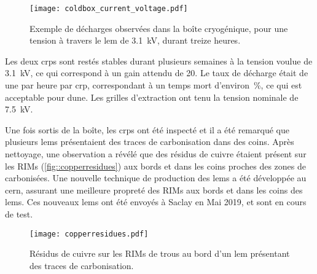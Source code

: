       \begin{figure}[!htb]
        \centering
        \texttt{[image: coldbox\_current\_voltage.pdf]}
        \caption[Décharges observées dans la boîte cryogénique]{\label{fig::coldbox_current_voltage}Exemple de décharges observées dans la boîte cryogénique, pour une tension à travers le \gls{lem} de \SI{3.1}{\kilo\volt}, durant treize heures.}
      \end{figure}
    
      Les deux \glspl{crp} sont restés stables durant plusieurs semaines à la tension voulue de \SI{3.1}{\kilo\volt}, ce qui correspond à un gain attendu de 20. Le taux de décharge était de une par heure par \gls{crp}, correspondant à un temps mort d'environ \,\%, ce qui est acceptable pour \gls{dune}. Les grilles d'extraction ont tenu la tension nominale de \SI{7.5}{\kilo\volt}. 

      Une fois sortis de la boîte, les \glspl{crp} ont été inspecté et il a été remarqué que plusieurs \glspl{lem} présentaient des traces de carbonisation dans des coins. Après nettoyage, une observation a révélé que des résidus de cuivre étaient présent sur les RIMs (\autoref{fig::copperresidues}) aux bords et dans les coins proches des zones de carbonisées. Une nouvelle technique de production des \glspl{lem} a été développée au \gls{cern}, assurant une meilleure propreté des RIMs aux bords et dans les coins des \glspl{lem}. Ces nouveaux \glspl{lem} ont été envoyés à Saclay en Mai 2019, et sont en cours de test.

      \begin{figure}
        \centering
        \texttt{[image: copperresidues.pdf]}
        \caption[Résidus de cuivre sur certains RIMs]{\label{fig::copperresidues}Résidus de cuivre sur les RIMs de trous au bord d'un \gls{lem} présentant des traces de carbonisation.}
      \end{figure}
        
